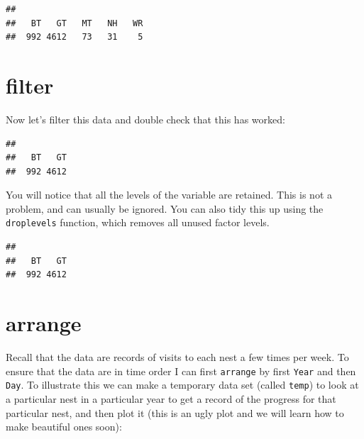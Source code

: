 \documentclass[
  a4paperpaper,
]{book}
\newenvironment{Shaded}{\begin{snugshade}}{\end{snugshade}}
\newcommand{\KeywordTok}[1]{\textcolor[rgb]{0.13,0.29,0.53}{\textbf{#1}}}
\newcommand{\NormalTok}[1]{#1}
\newcommand{\OperatorTok}[1]{\textcolor[rgb]{0.81,0.36,0.00}{\textbf{#1}}}
\newcommand{\StringTok}[1]{\textcolor[rgb]{0.31,0.60,0.02}{#1}}
\begin{document}
\begin{verbatim}
## 
##   BT   GT   MT   NH   WR 
##  992 4612   73   31    5
\end{verbatim}

\hypertarget{filter}{%
\section{filter}\label{filter}}

Now let's filter this data and double check that this has worked:

\begin{Shaded}
\end{Shaded}

\begin{verbatim}
## 
##   BT   GT 
##  992 4612
\end{verbatim}

You will notice that all the levels of the variable are retained. This is not a problem, and can usually be ignored. You can also tidy this up using the \texttt{droplevels} function, which removes all unused factor levels.

\begin{Shaded}
\end{Shaded}

\begin{verbatim}
## 
##   BT   GT 
##  992 4612
\end{verbatim}

\hypertarget{arrange}{%
\section{arrange}\label{arrange}}

Recall that the data are records of visits to each nest a few times per week. To ensure that the data are in time order I can first \texttt{arrange} by first \texttt{Year} and then \texttt{Day}. To illustrate this we can make a temporary data set (called \texttt{temp}) to look at a particular nest in a particular year to get a record of the progress for that particular nest, and then plot it (this is an ugly plot and we will learn how to make beautiful ones soon):
\end{document}
